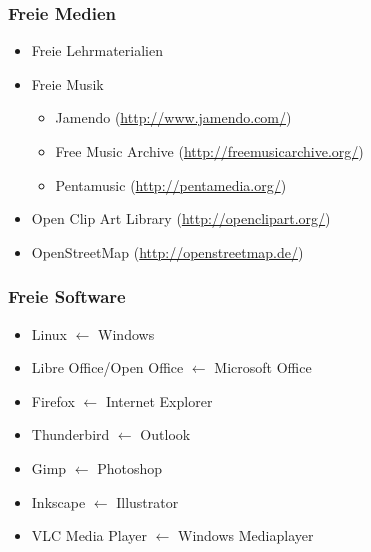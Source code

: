 \documentclass{beamer}
\begin{document}
\begin{frame}
    \frametitle{Freie Medien}
    \begin{itemize}
        \item<2-> Freie Lehrmaterialien
        \item<3-> Freie Musik
            \begin{itemize}
                \item<2-> Jamendo (\url{http://www.jamendo.com/})
                \item<2-> Free Music Archive (\url{http://freemusicarchive.org/})
                \item<2-> Pentamusic (\url{http://pentamedia.org/})
            \end{itemize}
        \item<4-> Open Clip Art Library (\url{http://openclipart.org/})
        \item<5-> OpenStreetMap (\url{http://openstreetmap.de/})
    \end{itemize}
\end{frame}

\begin{frame}
    \frametitle{Freie Software}
    \begin{itemize}
        \item<2-> Linux $ \gets $ Windows
        \item<2-> Libre Office/Open Office $ \gets $ Microsoft Office
        \item<2-> Firefox $ \gets $ Internet Explorer
        \item<2-> Thunderbird $ \gets $ Outlook
        \item<2-> Gimp $ \gets $ Photoshop
        \item<2-> Inkscape $ \gets $ Illustrator
        \item<2-> VLC Media Player $ \gets $ Windows Mediaplayer
    \end{itemize}
\end{frame}
\end{document}
